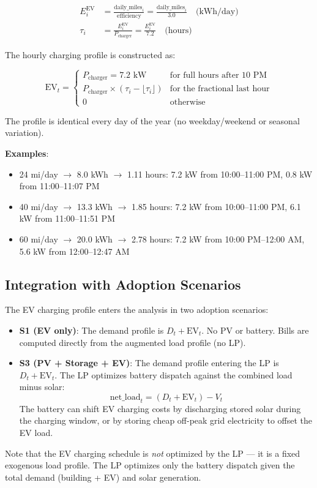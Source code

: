 \documentclass[11pt]{article}
\begin{document}
\begin{align}
    E_i^{\text{EV}} &= \frac{\text{daily\_miles}_i}{\text{efficiency}} = \frac{\text{daily\_miles}_i}{3.0} \quad \text{(kWh/day)} \\
    \tau_i &= \frac{E_i^{\text{EV}}}{P_{\text{charger}}} = \frac{E_i^{\text{EV}}}{7.2} \quad \text{(hours)}
\end{align}

The hourly charging profile is constructed as:

\begin{equation}
    \text{EV}_t = \begin{cases}
        P_{\text{charger}} = 7.2 \text{ kW} & \text{for full hours after 10 PM} \\
        P_{\text{charger}} \times (\tau_i - \lfloor \tau_i \rfloor) & \text{for the fractional last hour} \\
        0 & \text{otherwise}
    \end{cases}
\end{equation}

The profile is identical every day of the year (no weekday/weekend or seasonal variation).

\textbf{Examples}:
\begin{itemize}
    \item 24 mi/day $\rightarrow$ 8.0 kWh $\rightarrow$ 1.11 hours: 7.2 kW from 10:00--11:00 PM, 0.8 kW from 11:00--11:07 PM
    \item 40 mi/day $\rightarrow$ 13.3 kWh $\rightarrow$ 1.85 hours: 7.2 kW from 10:00--11:00 PM, 6.1 kW from 11:00--11:51 PM
    \item 60 mi/day $\rightarrow$ 20.0 kWh $\rightarrow$ 2.78 hours: 7.2 kW from 10:00 PM--12:00 AM, 5.6 kW from 12:00--12:47 AM
\end{itemize}

\subsection{Integration with Adoption Scenarios}

The EV charging profile enters the analysis in two adoption scenarios:

\begin{itemize}
    \item \textbf{S1 (EV only)}: The demand profile is $D_t + \text{EV}_t$. No PV or battery. Bills are computed directly from the augmented load profile (no LP).

    \item \textbf{S3 (PV + Storage + EV)}: The demand profile entering the LP is $D_t + \text{EV}_t$. The LP optimizes battery dispatch against the combined load minus solar:
    \begin{equation}
        \text{net\_load}_t = (D_t + \text{EV}_t) - V_t
    \end{equation}
    The battery can shift EV charging costs by discharging stored solar during the charging window, or by storing cheap off-peak grid electricity to offset the EV load.
\end{itemize}

Note that the EV charging schedule is \textit{not} optimized by the LP --- it is a fixed exogenous load profile. The LP optimizes only the battery dispatch given the total demand (building + EV) and solar generation.
\end{document}
